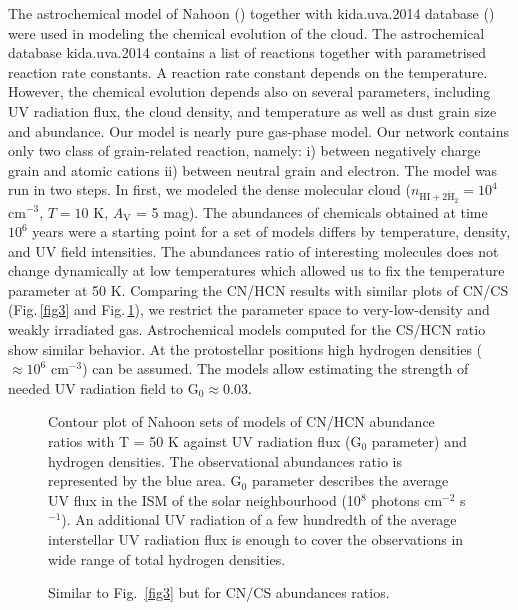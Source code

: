 \documentclass[a4paper]{article}
\begin{document}
\indent \indent The astrochemical model of Nahoon (\cite{wakelam2012}) together with kida.uva.2014 database (\cite{wakelam2015}) were used in modeling the chemical evolution of the cloud. The astrochemical database kida.uva.2014 contains a list of reactions together with parametrised reaction rate constants. A reaction rate constant depends on the temperature. However, the chemical evolution depends also on several parameters, including UV radiation flux, the cloud density, and temperature as well as dust grain size and abundance. Our model is nearly pure gas-phase model. Our network contains only two class of grain-related reaction, namely: i) between negatively charge grain and atomic cations ii) between neutral grain and electron. The model was run in two steps. In first, we modeled the dense molecular cloud ($n_\mathrm{HI+2 \dot H_2} = 10^4$ cm$^{-3}$, $T = 10$ K, $A_\mathrm{V}$ = 5 mag). The abundances of chemicals obtained at time $10^6$ years were a starting point for a set of models differs by temperature, density, and UV field intensities. The abundances ratio of interesting molecules does not change dynamically at low temperatures which allowed us to fix the temperature parameter at 50 K. Comparing the CN/HCN results with similar plots of CN/CS (Fig.\,\ref{fig3} and Fig.\,\ref{fig4}), we restrict the parameter space to very-low-density and weakly irradiated gas. Astrochemical models computed for the CS/HCN ratio show similar behavior. At the protostellar positions high hydrogen densities ($\approx 10^6$ cm$^{-3}$) can be assumed. The models allow estimating the strength of needed UV radiation field to G$_0 \approx 0.03$. 

\begin{figure}[!h]
\centering
\begin{minipage}[t]{.45\linewidth}
\centering
{}
\caption{Contour plot of Nahoon sets of models of CN/HCN abundance ratios with T = 50 K against UV radiation flux (G$_0$ parameter) and hydrogen densities. The observational abundances ratio is represented by the blue area. G$_0$ parameter describes the average UV flux in the ISM of the solar neighbourhood (10$^8$ photons cm$^{−2}$ s$^{−1}$). An additional UV radiation of a few hundredth of the average interstellar UV radiation flux is enough to cover the observations in wide range of total hydrogen densities.}\label{fig3}
\end{minipage}
\hfill
\begin{minipage}[t]{.45\linewidth}
\centering
{}
\caption{Similar to Fig.~\ref{fig3} but for CN/CS abundances ratios.}\label{fig4}
\end{minipage}
\end{figure}
\end{document}
